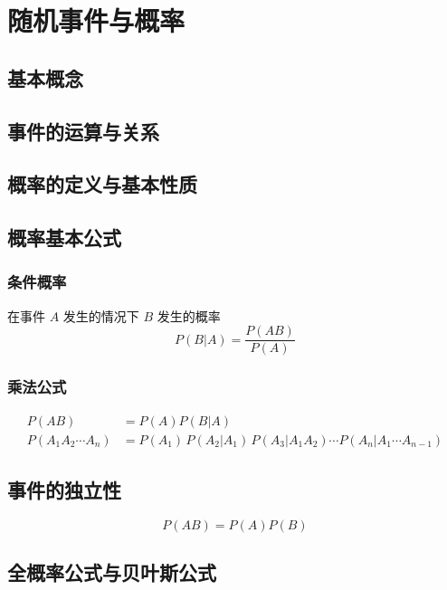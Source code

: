 \chapter{随机事件与概率}

\section{基本概念}
\label{sec:基本概念}

\section{事件的运算与关系}
\label{sec:事件的运算与关系}

\section{概率的定义与基本性质}
\label{sec:概率的定义与基本性质}

\section{概率基本公式}
\label{sec:概率基本公式}

\subsection{条件概率}
\label{sub:条件概率}


在事件 $A$ 发生的情况下 $B$ 发生的概率
\[
    P(B|A) = \frac{P(AB)}{P(A)}
\]

\subsection{乘法公式}
\label{sub:乘法公式}

\[
    \begin{aligned}
        P(AB) &= P(A) P(B |  A) \\
        P(A_1 A_2 \cdots A_n) &= P(A_1)\, P(A_2 | A_1) \, P(A_3 | A_1 A_2) \cdots P(A_n | A_1 \cdots A_{n-1})
    \end{aligned}
\]

\section{事件的独立性}
\label{sec:事件的独立性}

\[
    P(AB) = P(A) P(B)
\]

\section{全概率公式与贝叶斯公式}
\label{sec:全概率公式与贝叶斯公式}

